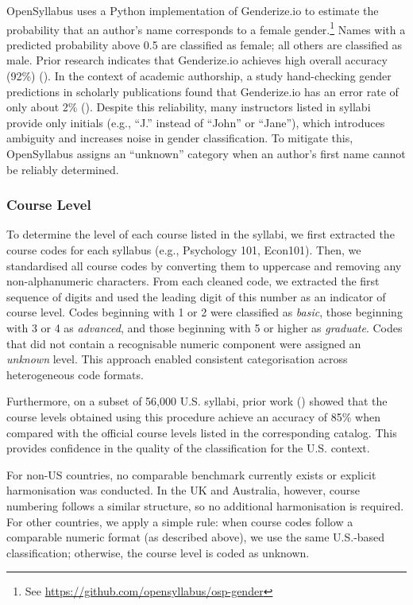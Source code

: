 \documentclass[
  british,
  12pt, %
]{article}
\begin{document}
OpenSyllabus uses a Python implementation of Genderize.io to estimate the probability that an author's name corresponds to a female gender.\footnote{See \url{https://github.com/opensyllabus/osp-gender}} Names with a predicted probability above 0.5 are classified as female; all others are classified as male. Prior research indicates that Genderize.io achieves high overall accuracy (92\%) (). In the context of academic authorship, a study hand-checking gender predictions in scholarly publications found that Genderize.io has an error rate of only about 2\% (). Despite this reliability, many instructors listed in syllabi provide only initials (e.g., ``J.'' instead of ``John'' or ``Jane''), which introduces ambiguity and increases noise in gender classification. To mitigate this, OpenSyllabus assigns an ``unknown'' category when an author's first name cannot be reliably determined.

\subsubsection{Course Level}\label{course-level}

To determine the level of each course listed in the syllabi, we first extracted the course codes for each syllabus (e.g., Psychology 101, Econ101). Then, we standardised all course codes by converting them to uppercase and removing any non-alphanumeric characters. From each cleaned code, we extracted the first sequence of digits and used the leading digit of this number as an indicator of course level. Codes beginning with 1 or 2 were classified as \emph{basic}, those beginning with 3 or 4 as \emph{advanced}, and those beginning with 5 or higher as \emph{graduate}. Codes that did not contain a recognisable numeric component were assigned an \emph{unknown} level. This approach enabled consistent categorisation across heterogeneous code formats.

Furthermore, on a subset of 56,000 U.S. syllabi, prior work () showed that the course levels obtained using this procedure achieve an accuracy of 85\% when compared with the official course levels listed in the corresponding catalog. This provides confidence in the quality of the classification for the U.S. context.

For non-US countries, no comparable benchmark currently exists or explicit harmonisation was conducted. In the UK and Australia, however, course numbering follows a similar structure, so no additional harmonisation is required. For other countries, we apply a simple rule: when course codes follow a comparable numeric format (as described above), we use the same U.S.-based classification; otherwise, the course level is coded as unknown.
\end{document}
